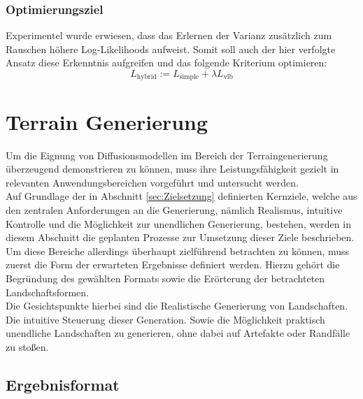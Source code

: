 \subsubsection {Optimierungsziel}

Experimentel wurde erwiesen, dass das Erlernen der Varianz zusätzlich zum Rauschen höhere Log-Likelihoods aufweist. Somit soll auch der hier verfolgte Ansatz diese Erkenntnis aufgreifen und das folgende Kriterium optimieren:
\begin{equation}
    L_\text{hybrid} := L_\text{simple} + \lambda L_\text{vlb}
\end{equation}



\section {Terrain Generierung}
\label{sec:Terraingenerierung}

Um die Eignung von Diffusionsmodellen im Bereich der Terraingenerierung überzeugend demonstrieren zu können, muss ihre Leistungsfähigkeit gezielt in relevanten Anwendungsbereichen vorgeführt und untersucht werden. \\
Auf Grundlage der in Abschnitt \ref{sec:Zielsetzung} definierten Kernziele, welche aus den zentralen Anforderungen an die Generierung, nämlich Realismus, intuitive Kontrolle und die Möglichkeit zur unendlichen Generierung, bestehen, werden in diesem Abschnitt die geplanten Prozesse zur Umsetzung dieser Ziele beschrieben. \\
Um diese Bereiche allerdings überhaupt zielführend betrachten zu können, muss zuerst die Form der erwarteten Ergebnisse definiert werden. Hierzu gehört die Begründung des gewählten Formats sowie die Erörterung der betrachteten Landschaftsformen. \\
Die Gesichtspunkte hierbei sind die Realistische Generierung von Landschaften. Die intuitive Steuerung dieser Generation. Sowie die Möglichkeit praktisch unendliche Landschaften zu generieren, ohne dabei auf Artefakte oder Randfälle zu stoßen. 

\subsection {Ergebnisformat}
\label{subsec:Ergebnisformat}

